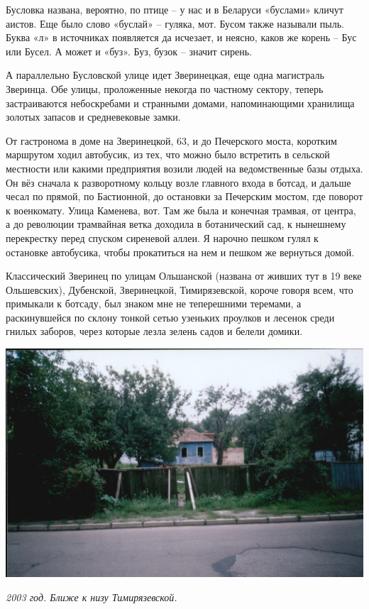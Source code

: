Бусловка названа, вероятно, по птице – у нас и в Беларуси «буслами» кличут аистов. Еще было слово «буслай» – гуляка, мот. Бусом также называли пыль. Буква «л» в источниках появляется да исчезает, и неясно, каков же корень – Бус или Бусел. А может и «буз». Буз, бузок – значит сирень.

А параллельно Бусловской улице идет Зверинецкая, еще одна магистраль Зверинца. Обе улицы, проложенные некогда по частному сектору, теперь застраиваются небоскребами и странными домами, напоминающими хранилища золотых запасов и средневековые замки.

От гастронома в доме на Зверинецкой, 63, и до Печерского моста, коротким маршрутом ходил автобусик, из тех, что можно было встретить в сельской местности или какими предприятия возили людей на ведомственные базы отдыха. Он вёз сначала к разворотному кольцу возле главного входа в ботсад, и дальше чесал по прямой, по Бастионной, до остановки за Печерским мостом, где поворот к военкомату. Улица Каменева, вот. Там же была и конечная трамвая, от центра, а до революции трамвайная ветка доходила в ботанический сад, к нынешнему перекрестку перед спуском сиреневой аллеи. Я нарочно пешком гулял к остановке автобусика, чтобы прокатиться на нем и пешком же вернуться домой.

Классический Зверинец по улицам Ольшанской (названа от живших тут в 19 веке Ольшевских), Дубенской, Зверинецкой, Тимирязевской, короче говоря всем, что примыкали к ботсаду, был знаком мне не теперешними теремами, а раскинувшейся по склону тонкой сетью узеньких проулков и лесенок среди гнилых заборов, через которые лезла зелень садов и белели домики. 

\begin{center}
\includegraphics[width=\linewidth]{chast-vosp/zver/out0015.jpg}

\textit{2003 год. Ближе к низу Тимирязевской.}
\end{center}


